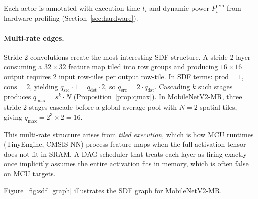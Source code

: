 \documentclass[journal]{IEEEtran}
\begin{document}
Each actor is annotated with execution time $t_i$ and dynamic power $P_i^{\mathrm{dyn}}$ from hardware profiling (Section~\ref{sec:hardware}).

\paragraph{Multi-rate edges.}
Stride-2 convolutions create the most interesting SDF structure.
A stride-2 layer consuming a $32 \times 32$ feature map tiled into row groups and producing $16 \times 16$ output requires 2 input row-tiles per output row-tile.
In SDF terms: $\mathrm{prod} = 1$, $\mathrm{cons} = 2$, yielding $q_{\mathrm{src}} \cdot 1 = q_{\mathrm{dst}} \cdot 2$, so $q_{\mathrm{src}} = 2 \cdot q_{\mathrm{dst}}$.
Cascading $k$ such stages produces $q_{\max} = s^k \cdot N$ (Proposition~\ref{prop:qmax}).
In MobileNetV2-MR, three stride-2 stages cascade before a global average pool with $N = 2$ spatial tiles, giving $q_{\max} = 2^3 \times 2 = 16$.

This multi-rate structure arises from \emph{tiled execution}, which is how MCU runtimes (TinyEngine, CMSIS-NN) process feature maps when the full activation tensor does not fit in SRAM.
A DAG scheduler that treats each layer as firing exactly once implicitly assumes the entire activation fits in memory, which is often false on MCU targets.

Figure~\ref{fig:sdf_graph} illustrates the SDF graph for MobileNetV2-MR.
\end{document}
